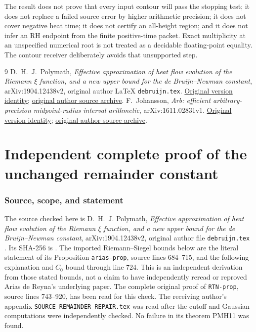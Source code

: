The result does not prove that every input contour will pass the
stopping test; it does not replace a failed source error by higher
arithmetic precision; it does not cover negative heat time; it
does not certify an all-height region; and it does not infer an RH
endpoint from the finite positive-time packet. Exact multiplicity
at an unspecified numerical root is not treated as a decidable
floating-point equality. The contour receiver deliberately avoids
that unsupported step.

\begin{thebibliography}{9}
D.~H.~J.~Polymath,
\emph{Effective approximation of heat flow evolution of the Riemann
$\xi$ function, and a new upper bound for the de Bruijn--Newman
constant}, arXiv:1904.12438v2, original author LaTeX
\texttt{debruijn.tex}.
\href{https://arxiv.org/abs/1904.12438v2}{Original version identity};
\href{https://arxiv.org/src/1904.12438v2}{original author source archive}.
F.~Johansson, \emph{Arb: efficient arbitrary-precision
midpoint-radius interval arithmetic}, arXiv:1611.02831v1.
\href{https://arxiv.org/abs/1611.02831v1}{Original version identity};
\href{https://arxiv.org/src/1611.02831v1}{original author source archive}.
\end{thebibliography}

\endgroup

\clearpage\begingroup
\part*{Independent complete proof of the unchanged remainder constant}
\newcommand{\pmindependentR}{\mathbb R}
\newcommand{\pmindependentC}{\mathbb C}
\newcommand{\pmindependentdd}{\,\mathrm d}
\newtheorem{pmindependenttheorem}{Theorem}



\section{Source, scope, and statement}

The source checked here is D.~H.~J. Polymath,
\emph{Effective approximation of heat flow evolution of the Riemann
$\xi$ function, and a new upper bound for the de Bruijn--Newman
constant}, arXiv:1904.12438v2, original author file
\texttt{debruijn.tex} \cite{pmindependent:polymath}. Its SHA-256 is
.
The imported Riemann--Siegel bounds below are the literal statement
of its Proposition \texttt{arias-prop}, source lines 684--715,
and the following explanation and $C_0$ bound through line 724.
This is an independent derivation from those stated bounds, not
a claim to have independently reread or reproved Arias de Reyna's
underlying paper. The complete original proof of
\texttt{RTN-prop}, source lines 743--920, has been read for this check.
The receiving author's appendix \texttt{SOURCE\_REMAINDER\_REPAIR.tex}
was read after the cutoff and Gaussian computations were independently
checked. No failure in its theorem PMH11 was found.

